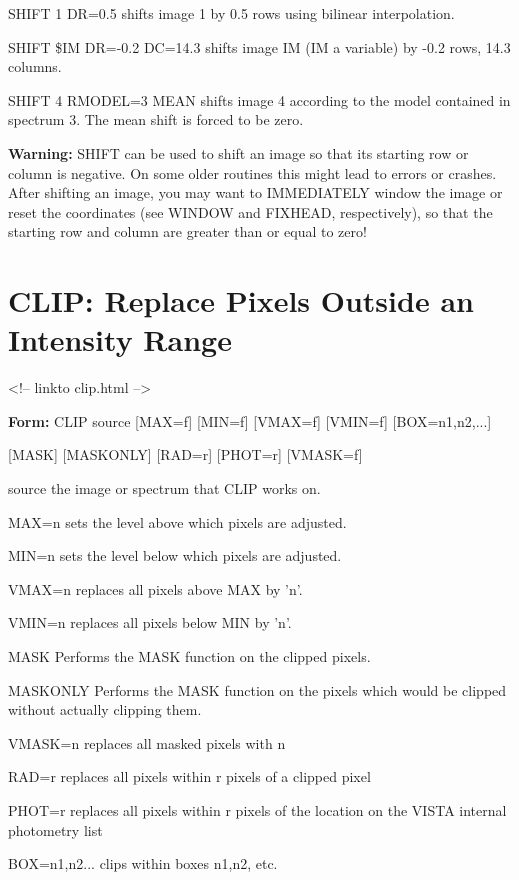 \begin{example}
  \item[SHIFT 1 DR=0.5\hfill]{shifts image 1 by 0.5 rows using
     bilinear interpolation.}
  \item[SHIFT \$IM DR=-0.2 DC=14.3\hfill]{shifts image IM (IM a variable)
     by -0.2 rows, 14.3 columns.}
  \item[SHIFT 4 RMODEL=3 MEAN  \hfill]{shifts image 4 according to the
     model contained in spectrum 3.
     The mean shift is forced to be zero.}
\end{example}

\textbf{Warning:} SHIFT can be used to shift an image so that its starting row
or column is negative.  On some older routines this might lead to errors or
crashes. After shifting an image, you may want to IMMEDIATELY window the
image or reset the coordinates (see WINDOW and FIXHEAD, respectively), so
that the starting row and column are greater than or equal to zero!

\section{CLIP: Replace Pixels Outside an Intensity Range}
\begin{rawhtml}
<!-- linkto clip.html -->
\end{rawhtml}

\begin{command}
  \item[\textbf{Form: } CLIP source {[MAX=f]} {[MIN=f]} {[VMAX=f]} {[VMIN=f]} 
       {[BOX=n1,n2,...]}\hfill]{}
  \item[]{{[MASK]} {[MASKONLY]} {[RAD=r]} {[PHOT=r]} {[VMASK=f]}}
  \item[source]{the image or spectrum that CLIP works on.}
  \item[MAX=n]{sets the level above which pixels are adjusted.}
  \item[MIN=n]{sets the level below which pixels are adjusted.}
  \item[VMAX=n]{replaces all pixels above MAX by 'n'.}
  \item[VMIN=n]{replaces all pixels below MIN by 'n'.}
  \item[MASK]{Performs the MASK function on the clipped pixels.}
  \item[MASKONLY]{Performs the MASK function on the pixels which
       would be clipped without actually clipping them.}
  \item[VMASK=n]{replaces all masked pixels with n}
  \item[RAD=r]{replaces all pixels within r pixels of a clipped pixel}
  \item[PHOT=r]{replaces all pixels within r pixels of the location
       on the VISTA internal photometry list}
  \item[BOX=n1,n2...]{clips within boxes n1,n2, etc.}
\end{command}

